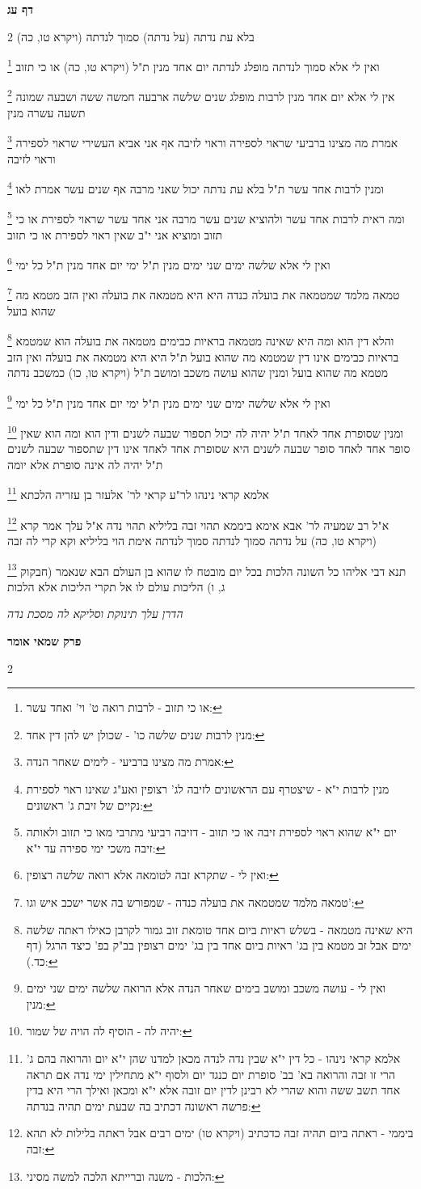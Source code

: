 \documentclass[12pt, openany]{book}
\newcommand{\sethebfont}{
\fontsize{10.5pt}{21.0pt} \selectfont
}
\newcommand{\twocol}[1]{
	{\sethebfont \begin{multicols}{2}
			#1
	\end{multicols}}	
}
\newcommand{\chapname}{}
\newcommand{\sectname}{}
\newcommand{\newchap}[1]{
	\addcontentsline{toc}{chapter}{#1}
	\renewcommand{\chapname}{#1}
		\begin{center}
			\textbf{%
\fontsize{16pt}{16pt}\selectfont
				#1}
		\end{center}
}
\newcommand{\newsection}[1]{
	\renewcommand{\sectname}{#1}	
	\vspace{-\baselineskip}
	\begin{center}
		\textbf{%
\fontsize{16pt}{16pt}\selectfont
			#1}
	\end{center}
	\vspace{-\baselineskip}
	\nopagebreak
}
\newcommand{\footnotecomment}[1]{
	\renewcommand\thefootnote{}
	\footnote{#1}}
\newcommand{\commenta}[1]{\footnotecomment{#1}}
\begin{document}
{\newsection{דף עג}
\twocol{(ויקרא טו, כה) בלא עת נדתה (על נדתה) סמוך לנדתה 
\commenta{או כי תזוב - לרבות רואה ט' וי' ואחד עשר:}
ואין לי אלא סמוך לנדתה מופלג לנדתה יום אחד מנין ת"ל (ויקרא טו, כה) או כי תזוב 
\commenta{מנין לרבות שנים שלשה כו' - שכולן יש להן דין אחד:}
אין לי אלא יום אחד מנין לרבות מופלג שנים שלשה ארבעה חמשה ששה ושבעה שמונה תשעה עשרה מנין 
\commenta{אמרת מה מצינו ברביעי - לימים שאחר הנדה:}
אמרת מה מצינו ברביעי שראוי לספירה וראוי לזיבה אף אני אביא העשירי שראוי לספירה וראוי לזיבה 
\commenta{מנין לרבות י"א - שיצטרף עם הראשונים לזיבה לג' רצופין ואע"ג שאינו ראוי לספירת נקיים של זיבת ג' ראשונים:}
ומנין לרבות אחד עשר ת"ל בלא עת נדתה יכול שאני מרבה אף שנים עשר אמרת לאו 
\commenta{יום י"א שהוא ראוי לספירת זיבה או כי תזוב - דזיבה רביעי מתרבי מאו כי תזוב ולאותה זיבה משכי ימי ספירה עד י"א: }
ומה ראית לרבות אחד עשר ולהוציא שנים עשר מרבה אני אחד עשר שראוי לספירת או כי תזוב ומוציא אני י"ב שאין ראוי לספירת או כי תזוב 
\commenta{ואין לי - שתקרא זבה לטומאה אלא רואה שלשה רצופין:}
ואין לי אלא שלשה ימים שני ימים מנין ת"ל ימי יום אחד מנין ת"ל כל ימי
\commenta{טמאה מלמד שמטמאה את בועלה כנדה - שמפורש בה אשר ישכב איש וגו':}
טמאה מלמד שמטמאה את בועלה כנדה היא היא מטמאה את בועלה ואין הזב מטמא מה שהוא בועל 
\commenta{היא שאינה מטמאה - בשלש ראיות ביום אחד טומאת זוב גמור לקרבן כאילו ראתה שלשה ימים אבל זב מטמא בין בג' ראיות ביום אחד בין בג' ימים רצופין בב"ק בפ' כיצד הרגל (דף כד.):}
והלא דין הוא ומה היא שאינה מטמאה בראיות כבימים מטמאה את בועלה הוא שמטמא בראיות כבימים אינו דין שמטמא מה שהוא בועל ת"ל היא היא מטמאה את בועלה ואין הזב מטמא מה שהוא בועל 
ומנין שהוא עושה משכב ומושב ת"ל (ויקרא טו, כו) כמשכב נדתה 
\commenta{ואין לי - עושה משכב ומושב בימים שאחר הנדה אלא הרואה שלשה ימים שני ימים מנין:}
ואין לי אלא שלשה ימים שני ימים מנין ת"ל ימי יום אחד מנין ת"ל כל ימי 
\commenta{יהיה לה - הוסיף לה הויה של שמור:}
ומנין שסופרת אחד לאחד ת"ל יהיה לה יכול תספור שבעה לשנים ודין הוא ומה הוא שאין סופר אחד לאחד סופר שבעה לשנים היא שסופרת אחד לאחד אינו דין שתספור שבעה לשנים ת"ל יהיה לה אינה סופרת אלא יומה
\commenta{אלמא קראי נינהו - כל דין י"א שבין נדה לנדה מכאן למדנו שהן י"א יום והרואה בהם ג' הרי זו זבה והרואה בא' בב' סופרת יום כנגד יום ולסוף י"א מתחילין ימי נדה אם תראה אחד תשב ששה והוא שהרי לא רבינן לדין יום זובה אלא י"א ומכאן ואילך הרי היא בדין פרשה ראשונה דכתיב בה שבעת ימים תהיה בנדתה:}
אלמא קראי נינהו לר"ע קראי לר' אלעזר בן עזריה הלכתא 
\commenta{ביממי - ראתה ביום תהיה זבה כדכתיב (ויקרא טו) ימים רבים אבל ראתה בלילות לא תהא זבה:}
א"ל רב שמעיה לר' אבא אימא ביממא תהוי זבה בליליא תהוי נדה א"ל עלך אמר קרא (ויקרא טו, כה) על נדתה סמוך לנדתה סמוך לנדתה אימת הוי בליליא וקא קרי לה זבה 
\commenta{הלכות - משנה וברייתא הלכה למשה מסיני:}
תנא דבי אליהו כל השונה הלכות בכל יום מובטח לו שהוא בן העולם הבא שנאמר (חבקוק ג, ו) הליכות עולם לו אל תקרי הליכות אלא הלכות
\par \par {\large\emph{הדרן עלך תינוקת וסליקא לה מסכת נדה}}\par \par 
}
\newchap{פרק  שמאי אומר}
\twocol{\clearpage}

}
\end{document}
